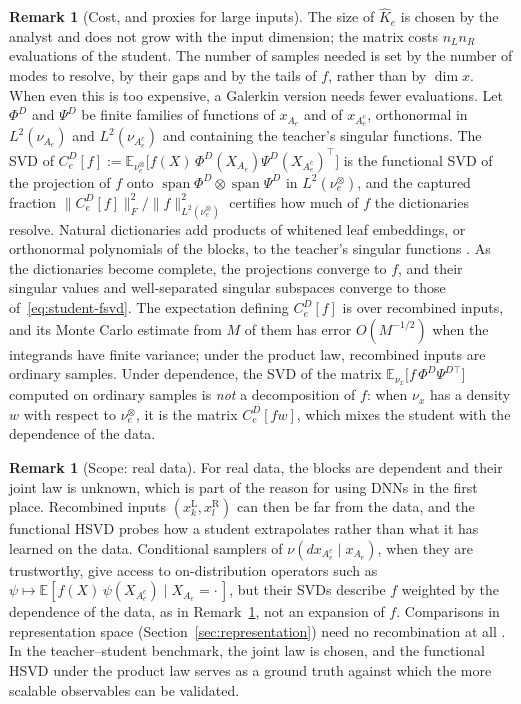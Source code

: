 \documentclass[11pt]{article}
\newcommand{\E}{\mathbb{E}}
\newcommand{\norm}[1]{\lVert #1\rVert}
\theoremstyle{definition}
\newtheorem{remark}[theorem]{Remark}
\numberwithin{equation}{section}
\begin{document}
\begin{remark}[Cost, and proxies for large inputs]\label{rem:fsvd-cost}
The size of $\hat K_e$ is chosen by the analyst and does not grow with the input dimension; the matrix costs $n_Ln_R$ evaluations of the student. The number of samples needed is set by the number of modes to resolve, by their gaps and by the tails of $f$, rather than by $\dim x$. When even this is too expensive, a Galerkin version needs fewer evaluations. Let $\Phi^D$ and $\Psi^D$ be finite families of functions of $x_{A_e}$ and of $x_{A_e^c}$, orthonormal in $L^2(\nu_{A_e})$ and $L^2(\nu_{A_e^c})$ and containing the teacher's singular functions. The SVD of $C^D_e[f]:=\E_{\nu^\otimes_e}\big[f(X)\,\Phi^D(X_{A_e})\Psi^D(X_{A_e^c})^\top\big]$ is the functional SVD of the projection of $f$ onto $\operatorname{span}\Phi^D\otimes\operatorname{span}\Psi^D$ in $L^2(\nu^\otimes_e)$, and the captured fraction $\norm{C^D_e[f]}_F^2/\norm f^2_{L^2(\nu^\otimes_e)}$ certifies how much of $f$ the dictionaries resolve. Natural dictionaries add products of whitened leaf embeddings, or orthonormal polynomials of the blocks, to the teacher's singular functions \citep[Section~8.2]{hfl_local}. As the dictionaries become complete, the projections converge to $f$, and their singular values and well-separated singular subspaces converge to those of~\eqref{eq:student-fsvd}. The expectation defining $C^D_e[f]$ is over recombined inputs, and its Monte Carlo estimate from $M$ of them has error $O(M^{-1/2})$ when the integrands have finite variance; under the product law, recombined inputs are ordinary samples. Under dependence, the SVD of the matrix $\E_{\nu_x}\big[f\,\Phi^D\Psi^{D\top}\big]$ computed on ordinary samples is \emph{not} a decomposition of $f$: when $\nu_x$ has a density $w$ with respect to $\nu^\otimes_e$, it is the matrix $C^D_e[fw]$, which mixes the student with the dependence of the data.
\end{remark}

\begin{remark}[Scope: real data]\label{rem:scope}
For real data, the blocks are dependent and their joint law is unknown, which is part of the reason for using DNNs in the first place. Recombined inputs $(x^{\mathrm L}_k,x^{\mathrm R}_l)$ can then be far from the data, and the functional HSVD probes how a student extrapolates rather than what it has learned on the data. Conditional samplers of $\nu(dx_{A_e^c}\mid x_{A_e})$, when they are trustworthy, give access to on-distribution operators such as $\psi\mapsto\E[f(X)\,\psi(X_{A_e^c})\mid X_{A_e}=\cdot\,]$, but their SVDs describe $f$ weighted by the dependence of the data, as in Remark~\ref{rem:fsvd-cost}, not an expansion of $f$. Comparisons in representation space (Section~\ref{sec:representation}) need no recombination at all \citep[Section~6.5]{hfl_surrogate}. In the teacher--student benchmark, the joint law is chosen, and the functional HSVD under the product law serves as a ground truth against which the more scalable observables can be validated.
\end{remark}
\end{document}
